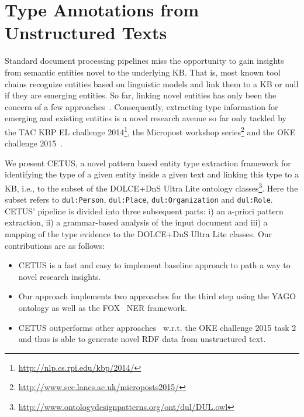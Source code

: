 \chapter[Extraction of Semantic Type Annotations from Unstructured Texts]{Type Annotations from Unstructured Texts}
\label{cha:cetus}


Standard document processing pipelines miss the opportunity to gain insights from semantic entities novel to the underlying \ac{KB}. 
That is, most known tool chains recognize entities based on linguistic models and link them to a \ac{KB} or null if they are emerging entities. 
So far, linking novel entities has only been the concern of a few approaches~\cite{AIDA,agdistis_iswc}.
Consequently, extracting type information for emerging and existing entities is a novel research avenue so far only tackled by the TAC KBP \ac{EL} challenge 2014\footnote{\url{http://nlp.cs.rpi.edu/kbp/2014/}}, the Micropost workshop series\footnote{\url{http://www.scc.lancs.ac.uk/microposts2015/}} and the OKE challenge 2015~\cite{okechallenge}.

We present CETUS, a novel pattern based entity type extraction framework for identifying the type of a given entity inside a given text and linking this type to a \ac{KB}, i.e., to the subset of the DOLCE+DnS Ultra Lite ontology classes\footnote{\url{http://www.ontologydesignpatterns.org/ont/dul/DUL.owl}}.
Here the subset refers to \texttt{dul:Person}, \texttt{dul:Place}, \texttt{dul:Organization} and \texttt{dul:Role}.
CETUS' pipeline is divided into three subsequent parts: i) an a-priori pattern extraction, ii) a grammar-based analysis of the input document and iii) a mapping of the type evidence to the DOLCE+DnS Ultra Lite classes. 
Our contributions are as follows:
\begin{itemize}
\item CETUS is a fast and easy to implement baseline approach to path a way to novel research insights.
\item Our approach implements two approaches for the third step using the YAGO ontology as well as the FOX~\cite{FOX} \ac{NER} framework.
\item CETUS outperforms other approaches~\cite{okechallenge} w.r.t. the OKE challenge 2015 task 2 and thus is able to generate novel \ac{RDF} data from unstructured text.
\end{itemize}

